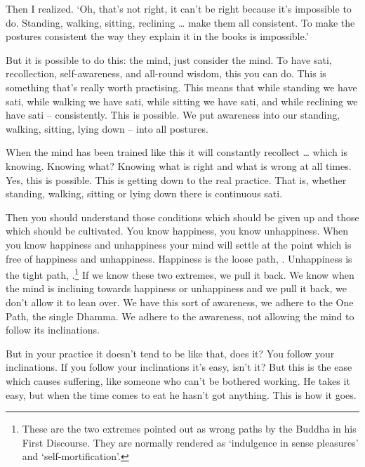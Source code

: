 Then I realized. `Oh, that's not right, it can't be right because it's impossible to do. Standing, walking, sitting, reclining \ldots{} make them all consistent. To make the postures consistent the way they explain it in the books is impossible.'

But it is possible to do this: the mind, just consider the mind. To have sati, recollection,  self-awareness, and  all-round wisdom, this you can do. This is something that's really worth practising. This means that while standing we have sati, while walking we have sati, while sitting we have sati, and while reclining we have sati -- consistently. This is possible. We put awareness into our standing, walking, sitting, lying down -- into all postures.

When the mind has been trained like this it will constantly recollect  \ldots{} which is knowing. Knowing what? Knowing what is right and what is wrong at all times. Yes, this is possible. This is getting down to the real practice. That is, whether standing, walking, sitting or lying down there is continuous sati.

Then you should understand those conditions which should be given up and those which should be cultivated. You know happiness, you know unhappiness. When you know happiness and unhappiness your mind will settle at the point which is free of happiness and unhappiness. Happiness is the loose path, . Unhappiness is the tight path, .\footnote{These are the two extremes pointed out as wrong paths by the Buddha in his First Discourse. They are normally rendered as `indulgence in sense pleasures' and `self-mortification'.} If we know these two extremes, we pull it back. We know when the mind is inclining towards happiness or unhappiness and we pull it back, we don't allow it to lean over. We have this sort of awareness, we adhere to the One Path, the single Dhamma. We adhere to the awareness, not allowing the mind to follow its inclinations.

But in your practice it doesn't tend to be like that, does it? You follow your inclinations. If you follow your inclinations it's easy, isn't it? But this is the ease which causes suffering, like someone who can't be bothered working. He takes it easy, but when the time comes to eat he hasn't got anything. This is how it goes.

